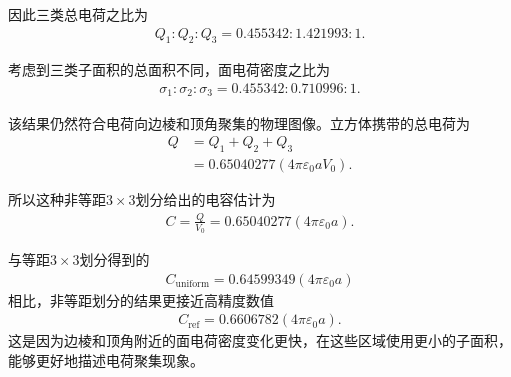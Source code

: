 \documentclass{article}
\begin{document}
因此三类总电荷之比为
\begin{align}
    Q_1:Q_2:Q_3
    =
    0.455342:1.421993:1.
\end{align}

考虑到三类子面积的总面积不同，面电荷密度之比为
\begin{align}
\boxed{
\sigma_1:\sigma_2:\sigma_3
=
0.455342:0.710996:1.
}
\end{align}

该结果仍然符合电荷向边棱和顶角聚集的物理图像。立方体携带的总电荷为
\begin{align}
Q
&=
Q_1+Q_2+Q_3
\\
&=
0.65040277
\left(
4\pi\varepsilon_0aV_0
\right).
\end{align}

所以这种非等距$3\times3$划分给出的电容估计为
\begin{align}
\boxed{
C
=
\frac{Q}{V_0}
=
0.65040277
\left(
4\pi\varepsilon_0a
\right).
}
\end{align}

与等距$3\times3$划分得到的
\begin{align}
C_{\mathrm{uniform}}
=
0.64599349
\left(
4\pi\varepsilon_0a
\right)
\end{align}
相比，非等距划分的结果更接近高精度数值
\begin{align}
C_{\mathrm{ref}}
=
0.6606782
\left(
4\pi\varepsilon_0a
\right).
\end{align}
这是因为边棱和顶角附近的面电荷密度变化更快，在这些区域使用更小的子面积，能够更好地描述电荷聚集现象。
\end{document}
